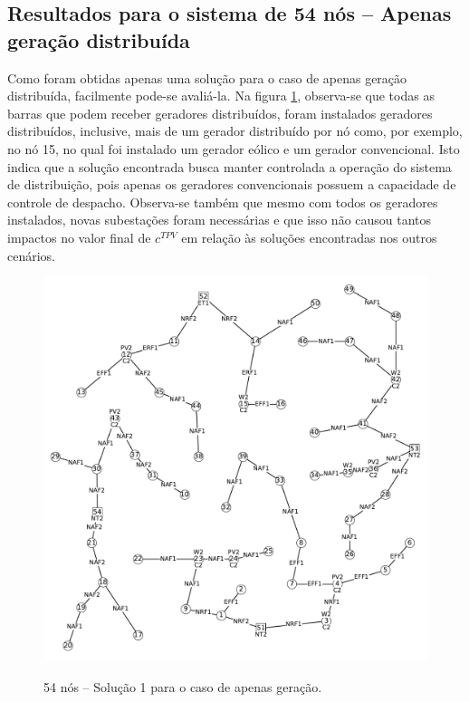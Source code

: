 \subsection{Resultados para o sistema de 54 nós -- Apenas geração distribuída}
\vspace{-0.2cm}
Como foram obtidas apenas uma solução para o caso de apenas geração distribuída, facilmente pode-se avaliá-la. Na figura \ref{fig:54_gen}, observa-se que todas as barras que podem receber geradores distribuídos, foram instalados geradores distribuídos, inclusive, mais de um gerador distribuído por nó como, por exemplo, no nó 15, no qual foi instalado um gerador eólico e um gerador convencional. Isto indica que a solução encontrada busca manter controlada a operação do sistema de distribuição, pois apenas os geradores convencionais possuem a capacidade de controle de despacho.
Observa-se também que mesmo com todos os geradores instalados, novas subestações foram necessárias e que isso não causou tantos impactos no valor final de $c^{TPV}$ em relação às soluções encontradas nos outros cenários.
\vspace{-0.2cm}
\begin{figure}[H]
 	\centering
    \caption{54 nós -- Solução 1 para o caso de apenas geração.}
    \includegraphics[width=1.02\textwidth]{cap4/resultados/54_bus_gen.pdf}\\
    \label{fig:54_gen}
\end{figure}


